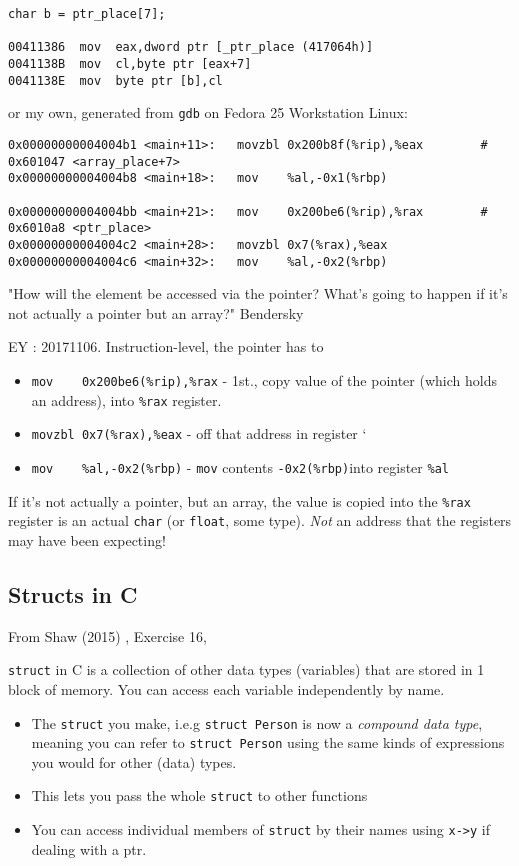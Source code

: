 \documentclass[10pt]{amsart}
\begin{document}
\begin{multicols*}{2}
\begin{lstlisting}
char b = ptr_place[7];

00411386  mov  eax,dword ptr [_ptr_place (417064h)]
0041138B  mov  cl,byte ptr [eax+7]
0041138E  mov  byte ptr [b],cl
\end{lstlisting}

or my own, generated from \verb|gdb| on Fedora 25 Workstation Linux:

\begin{lstlisting}
0x00000000004004b1 <main+11>:	movzbl 0x200b8f(%rip),%eax        # 0x601047 <array_place+7>
0x00000000004004b8 <main+18>:	mov    %al,-0x1(%rbp)

0x00000000004004bb <main+21>:	mov    0x200be6(%rip),%rax        # 0x6010a8 <ptr_place>
0x00000000004004c2 <main+28>:	movzbl 0x7(%rax),%eax
0x00000000004004c6 <main+32>:	mov    %al,-0x2(%rbp)
\end{lstlisting}

"How will the element be accessed via the pointer?  What's going to happen if it's not actually a pointer but an array?"  Bendersky \cite{Bend}   

EY : 20171106.  Instruction-level, the pointer has to     
\begin{itemize}
	\item \verb|mov    0x200be6(%rip),%rax| - 1st., copy value of the pointer (which holds an address), into \verb|%rax| register.  
	\item \verb|movzbl 0x7(%rax),%eax| - off that address in register `%
	\item \verb|mov    %al,-0x2(%rbp)| - \verb|mov| contents \verb|-0x2(%rbp)|into register \verb|%al|
\end{itemize}

If it's not actually a pointer, but an array, the value is copied into the \verb|%rax| register is an actual \verb|char| (or \verb|float|, some type).  \emph{Not} an address that the registers may have been expecting!  


\subsection{Structs in C}
From Shaw (2015) \cite{Shaw2015}, Exercise 16, 

\verb|struct| in C is a collection of other data types (variables) that are stored in 1 block of memory.  You can access each variable independently by name.  

\begin{itemize}
	\item The \verb|struct| you make, i.e.g \verb|struct Person| is now a \emph{compound data type}, meaning you can refer to \verb|struct Person| using the same kinds of expressions you would for other (data) types.
	\item This lets you pass the whole \verb|struct| to other functions
	\item You can access individual members of \verb|struct| by their names using \verb|x->y| if dealing with a ptr.  
\end{itemize}  


\end{multicols*}
\end{document}
